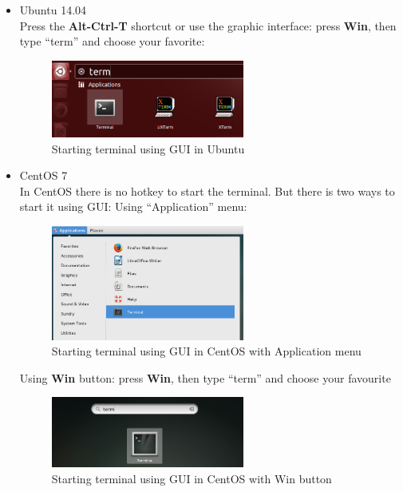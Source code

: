 \documentclass[a4paper,oneside,dvipsnames]{article}
\begin{document}
\begin{itemize}
  \item Ubuntu 14.04 \\
  Press the \textbf{Alt-Ctrl-T} shortcut or use the graphic interface: press \textbf{Win}, then type ``term'' and choose your favorite:
  \begin{figure}[H]
    \centering
    \includegraphics[width=0.6\textwidth]{terminal.png}
    \caption*{Starting terminal using GUI in Ubuntu}
    \label{fig:UbuntuTerm}
  \end{figure}
  \item CentOS 7 \\
  In CentOS there is no hotkey to start the terminal. But there is two ways to start it using GUI:
    \subitem Using ``Application'' menu:
    \begin{figure}[H]
      \centering
 
      \includegraphics[width=0.6\textwidth]{centos_term.png}
      \caption*{Starting terminal using GUI in CentOS with Application menu}
      \label{fig:CentosTerm}
    \end{figure}
    \subitem Using \textbf{Win} button: press \textbf{Win}, then type ``term'' and choose your favourite
    \begin{figure}[H]
      \centering
      \includegraphics[width=0.6\textwidth]{centos_win_term.png}
      \caption*{Starting terminal using GUI in CentOS with Win button}
      \label{fig:CentosTermWin}
    \end{figure}


\end{itemize}
\end{document}
